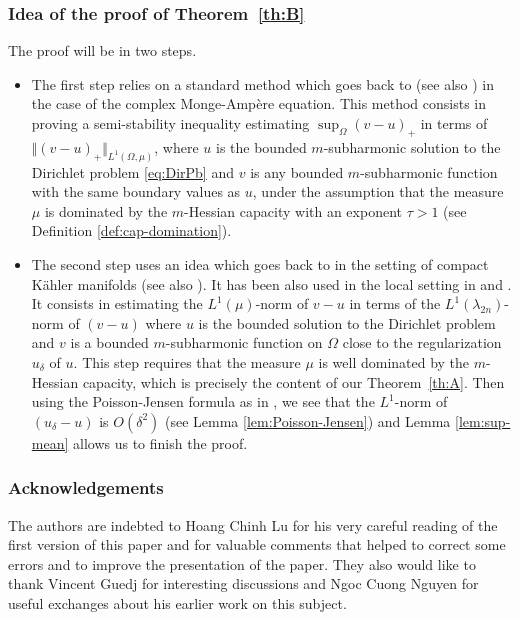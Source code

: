 \documentclass[JEP,XML,SOM,Unicode]{cedram}
\theoremstyle{definition}
\begin{document}
\subsubsection*{Idea of the proof of Theorem~\ref{th:B}}
The proof will be in two steps.
\begin{itemize}
\item
The first step relies on a standard method which goes back to \cite{EGZ09} (see also \cite{GKZ08}) in the case of the complex Monge-Ampère equation. This method consists in proving a semi-stability inequality estimating
$ \sup_{\Omega} (v-u)_+ $ in terms of $\Vert (v-u)_+\Vert_{L^{1} (\Omega,\mu)}$, where $u $ is the bounded $m$-subharmonic solution to the Dirichlet problem \eqref{eq:DirPb} and $v$ is any bounded $m$-subharmonic function with the same boundary values as $u$, under the assumption that the measure $\mu$ is dominated by the $m$-Hessian capacity with an exponent $\tau > 1$ (see Definition \ref{def:cap-domination}).

\item
The second step uses an idea which goes back to \cite{DDGKPZ15} in the setting of compact Kähler manifolds (see also \cite{GZ17}). It has been also used in the local setting in \cite{N18a} and \cite{KN19}. It consists in estimating the $L^1 (\mu)$-norm of $v - u$ in terms of the $L^1 (\lambda_{2 n})$-norm of $(v-u)$ where $u$ is the bounded solution to the Dirichlet problem and $v$ is a bounded $m$-subharmonic function on $\Omega$ close to the regularization $ u_\delta$ of $u$. This step requires that the measure $\mu$ is well dominated by the $m$-Hessian capacity, which is precisely the content of our Theorem~\ref{th:A}.
Then using the Poisson-Jensen formula as in \cite{GKZ08}, we see that the $L^1$-norm of $(u_\delta-u)$ is $O (\delta^2)$ (see Lemma \ref{lem:Poisson-Jensen}) and Lemma \ref{lem:sup-mean} allows us to finish the proof.
\end{itemize}

\subsubsection*{Acknowledgements}
The authors are indebted to Hoang Chinh Lu for his very careful reading of the first version of this paper and for valuable comments that helped to correct some errors and to improve the presentation of the paper. They also would like to thank Vincent Guedj for interesting discussions and Ngoc Cuong Nguyen for useful exchanges about his earlier work on this subject.
\end{document}
